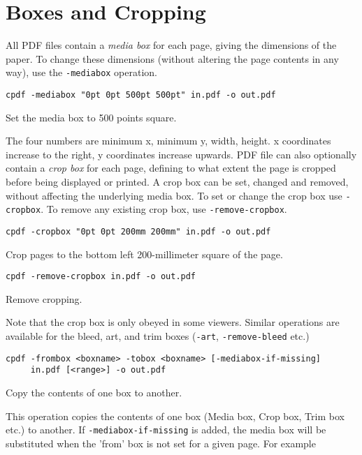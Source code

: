 \documentclass{book}
\begin{document}
  \section{Boxes and Cropping}
  All PDF files contain a \textit{media box} for each page, giving the
dimensions of the paper. To change these dimensions (without altering the page
contents in any way), use the \texttt{-mediabox} operation.
  \begin{framed}
  \small\verb!cpdf -mediabox "0pt 0pt 500pt 500pt" in.pdf -o out.pdf!

  \vspace{2.5mm}
  \noindent Set the media box to 500 points square.
  \end{framed}
  \noindent The four numbers are minimum x, minimum y, width, height. x
coordinates increase to the right, y coordinates increase upwards.
  PDF file can also optionally contain a \textit{crop box} for each page,
defining to what extent the page is cropped before being displayed or printed.
A crop box can be set, changed and removed, without affecting the underlying
media box. To set or change the crop box use \texttt{-cropbox}. To remove any
existing crop box, use \texttt{-remove-cropbox}.
  \begin{framed}
  \small\verb!cpdf -cropbox "0pt 0pt 200mm 200mm" in.pdf -o out.pdf!

  \vspace{2.5mm}
  \noindent Crop pages to the bottom left 200-millimeter square of the page.

  \vspace{2.5mm}
  \verb!cpdf -remove-cropbox in.pdf -o out.pdf!
  
  \vspace{2.5mm}
  \noindent Remove cropping.
  \end{framed}

\noindent Note that the crop box is only obeyed in some viewers. Similar operations are available for the bleed, art, and trim boxes (\texttt{-art}, \texttt{-remove-bleed} etc.)

  \begin{framed}
  \small\noindent\verb!cpdf -frombox <boxname> -tobox <boxname> [-mediabox-if-missing]! \\
  \noindent\verb!     in.pdf [<range>] -o out.pdf!

  \vspace{2.5mm}
  \noindent Copy the contents of one box to another.

  \end{framed}
  \noindent This operation copies the contents of one box (Media box, Crop box, Trim box etc.) to another. If \texttt{-mediabox-if-missing} is added, the media box will be substituted when the 'from' box is not set for a given page. For example
\end{document}
